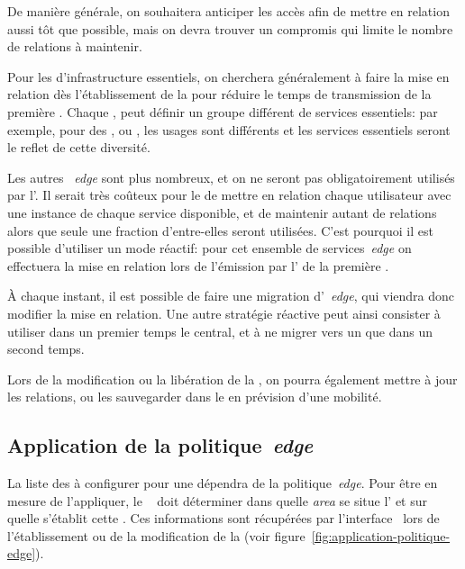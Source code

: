 \documentclass[../main.tex]{subfiles}
\begin{document}
De manière générale, on souhaitera anticiper les accès afin de mettre en relation aussi tôt que possible, mais on devra trouver un compromis qui limite le nombre de relations à maintenir.

Pour les  d’infrastructure essentiels, on cherchera généralement à faire la mise en relation dès l’établissement de la  pour réduire le temps de transmission de la première .
Chaque , peut définir un groupe différent de services essentiels: par exemple, pour des  ,  ou , les usages sont différents et les services essentiels seront le reflet de cette diversité.

Les autres ~\textit{edge} sont plus nombreux, et on ne seront pas obligatoirement utilisés par l’.
Il serait très coûteux pour le  de mettre en relation chaque utilisateur avec une instance de chaque service disponible, et de maintenir autant de relations alors que seule une fraction d’entre-elles seront utilisées.
C’est pourquoi il est possible d’utiliser un mode réactif: pour cet ensemble de services~\textit{edge} on effectuera la mise en relation lors de l’émission par l’ de la première .

À chaque instant, il est possible de faire une migration d’~\textit{edge}, qui viendra donc modifier la mise en relation.
Une autre stratégie réactive peut ainsi consister à utiliser dans un premier temps le  central, et à ne migrer vers un  que dans un second temps.

Lors de la modification ou la libération de la , on pourra également mettre à jour les relations, ou les sauvegarder dans le  en prévision d’une mobilité.
\pagebreak

\subsection{Application de la politique~\textit{edge}}
La liste des  à configurer pour une  dépendra de la politique~\textit{edge}.
Pour être en mesure de l’appliquer, le ~ doit déterminer dans quelle \textit{area} se situe l’ et sur quelle  s’établit cette .
Ces informations sont récupérées par l’interface~ lors de l’établissement ou de la modification de la  (voir figure~\ref{fig:application-politique-edge}).
\end{document}
